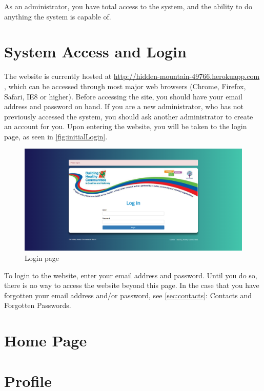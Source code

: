 \documentclass{bhcguides}
\begin{document}
As an administrator, you have total access to the system, and the ability to do anything the system is capable of. 

\section{System Access and Login}
\label{sec:syslogin}

The website is currently hosted at \url{http://hidden-mountain-49766.herokuapp.com} , which can be accessed through most major web browsers (Chrome, Firefox, Safari, IE8 or higher). Before accessing the site, you should have your email address and password on hand. If you are a new administrator, who has not previously accessed the system, you should ask another administrator to create an account for you. Upon entering the website, you will be taken to the login page, as seen in \autoref{fig:initialLogin}.

\begin{figure}[h!]
 \centerline{\includegraphics[width=\textwidth, height=\textheight, keepaspectratio]{loginscreen.png}}
 \caption{Login page}
 \label{fig:initialLogin}
\end{figure}

To login to the website, enter your email address and password. Until you do so, there is no way to access the website beyond this page. In the case that you have forgotten your email address and/or password, see \autoref{sec:contacts}: Contacts and Forgotten Passwords.

\pagebreak

\section{Home Page}
\label{sec:homepage}

\section{Profile}
\label{sec:profile}
\end{document}
